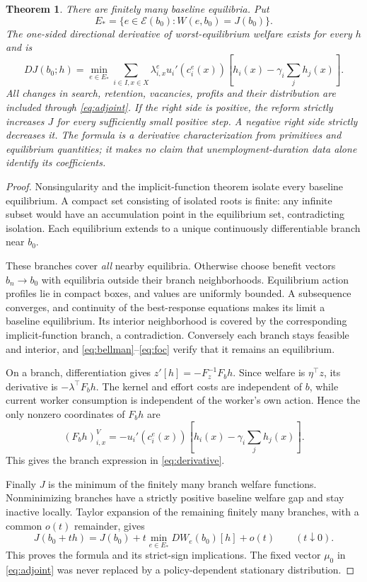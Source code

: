 \documentclass[11pt]{article}
\newtheorem{theorem}{Theorem}
\begin{document}
\begin{theorem}\label{thm:derivative}
There are finitely many baseline equilibria. Put
\[
 E_* =\{e\in\mathcal E(b_0):W(e,b_0)=J(b_0)\}.
\]
The one-sided directional derivative of worst-equilibrium welfare exists for every $h$ and is
\begin{equation}\label{eq:derivative}
 DJ(b_0;h)=\min_{e\in E_*}
 \sum_{i\in I,x\in X}\lambda^e_{i,x}u_i'(c_i^e(x))
       \left[h_i(x)-\gamma_i\sum_jh_j(x)\right].
\end{equation}
All changes in search, retention, vacancies, profits and their distribution are included through \eqref{eq:adjoint}. If the right side is positive, the reform strictly increases $J$ for every sufficiently small positive step. A negative right side strictly decreases it. The formula is a derivative characterization from primitives and equilibrium quantities; it makes no claim that unemployment-duration data alone identify its coefficients.
\end{theorem}
\begin{proof}
Nonsingularity and the implicit-function theorem isolate every baseline equilibrium. A compact set consisting of isolated roots is finite: any infinite subset would have an accumulation point in the equilibrium set, contradicting isolation. Each equilibrium extends to a unique continuously differentiable branch near $b_0$.

These branches cover \emph{all} nearby equilibria. Otherwise choose benefit vectors $b_n\to b_0$ with equilibria outside their branch neighborhoods. Equilibrium action profiles lie in compact boxes, and values are uniformly bounded. A subsequence converges, and continuity of the best-response equations makes its limit a baseline equilibrium. Its interior neighborhood is covered by the corresponding implicit-function branch, a contradiction. Conversely each branch stays feasible and interior, and \eqref{eq:bellman}--\eqref{eq:foc} verify that it remains an equilibrium.

On a branch, differentiation gives $z'[h]=-F_z^{-1}F_bh$. Since welfare is $\eta^\top z$, its derivative is $-\lambda^\top F_bh$. The kernel and effort costs are independent of $b$, while current worker consumption is independent of the worker's own action. Hence the only nonzero coordinates of $F_bh$ are
\[
 (F_bh)^V_{i,x}=-u_i'(c_i^e(x))
            \left[h_i(x)-\gamma_i\sum_jh_j(x)\right].
\]
This gives the branch expression in \eqref{eq:derivative}.

Finally $J$ is the minimum of the finitely many branch welfare functions. Nonminimizing branches have a strictly positive baseline welfare gap and stay inactive locally. Taylor expansion of the remaining finitely many branches, with a common $o(t)$ remainder, gives
\[
 J(b_0+th)=J(b_0)+t\min_{e\in E_*}DW_e(b_0)[h]+o(t)
 \qquad(t\downarrow0).
\]
This proves the formula and its strict-sign implications. The fixed vector $\mu_0$ in \eqref{eq:adjoint} was never replaced by a policy-dependent stationary distribution.
\end{proof}
\end{document}

